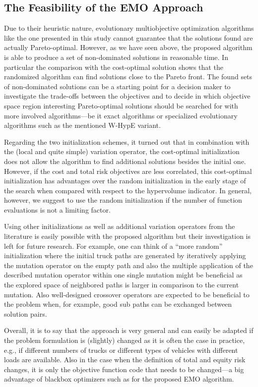 \documentclass[preprint,12pt]{elsarticle}
\begin{document}
\subsection{The Feasibility of the EMO Approach}
Due to their heuristic nature, evolutionary multiobjective optimization algorithms like the one presented in this study cannot guarantee that the solutions found are actually Pareto-optimal. However, as we have seen above, the proposed algorithm is able to produce a set of non-dominated solutions in reasonable time. In particular the comparison with the cost-optimal solution shows that the randomized algorithm can find solutions close to the Pareto front. The found sets of non-dominated solutions can be a starting point for a decision maker to investigate the trade-offs between the objectives and to decide in which objective space region interesting Pareto-optimal solutions should be searched for with more involved algorithms---be it exact algorithms or specialized evolutionary algorithms such as the mentioned W-HypE variant.

Regarding the two initialization schemes, it turned out that in combination with the (local and quite simple) variation operator, the cost-optimal initialization does not allow the algorithm to find additional solutions besides the initial one. However, if the cost and total risk objectives are less correlated, this cost-optimal initialization has advantages over the random initialization in the early stage of the search when compared with respect to the hypervolume indicator. In general, however, we suggest to use the random initialization if the number of function evaluations is not a limiting factor.

Using other initializations as well as additional variation operators from the literature is easily possible with the proposed algorithm but their investigation is left for future research. For example, one can think of a ``more random'' initialization where the initial truck paths are generated by iteratively applying the mutation operator on the empty path and also the multiple application of the described mutation operator within one single mutation might be beneficial as the explored space of neighbored paths is larger in comparison to the current mutation. Also well-designed crossover operators are expected to be beneficial to the problem when, for example, good sub paths can be exchanged between solution pairs. 

Overall, it is to say that the approach is very general and can easily be adapted if the problem formulation is (slightly) changed as it is often the case in practice, e.g., if different numbers of trucks or different types of vehicles with different loads are available. Also in the case when the definition of total and equity risk changes, it is only the objective function code that needs to be changed---a big advantage of blackbox optimizers such as for the proposed EMO algorithm.
	
\end{document}
